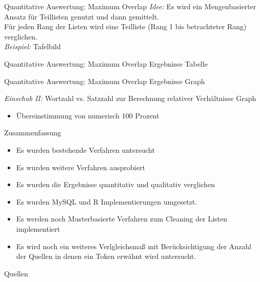 \documentclass{beamer}
\begin{document}
\begin{frame}{Quantitative Auswertung: Maximum Overlap}
	\emph{Idee: } Es wird ein Mengenbasierter Ansatz f\"ur Teillisten genutzt und dann gemittelt.\\
	F\"ur jeden Rang der Listen wird eine Teilliste (Rang 1 bis betrachteter Rang) verglichen.\\
	\vspace{1cm}
	\emph{Beispiel:} Tafelbild
\end{frame}

\begin{frame}{Quantitative Auswertung: Maximum Overlap Ergebnisse}
	Tabelle
\end{frame}

\begin{frame}{Quantitative Auswertung: Maximum Overlap Ergebnisse}
	Graph
\end{frame}

\begin{frame}{\emph{Einschub II: }Wortzahl vs. Satzzahl zur Berechnung relativer Verh\"altnisse}
	Graph
	\begin{itemize}
		\item{\"Ubereinstimmung von numerisch 100 Prozent}
	\end{itemize}
\end{frame}



\begin{frame}{Zusammenfassung}
	\begin{itemize}
		\item{Es wurden bestehende Verfahren untersucht}
		\item{Es wurden weitere Verfahren ausprobiert}
		\item{Es wurden die Ergebnisse quantitativ und qualitativ verglichen}
		\item{Es wurden MySQL und R Implementierungen umgesetzt.}
		\item{Es werden noch Musterbasierte Verfahren zum Cleaning der Listen implementiert}
		\item{Es wird noch ein weiteres Verlgleichsmaß mit Ber\"ucksichtigung der Anzahl der Quellen in denen ein Token erw\"ahnt wird untersucht.}
	\end{itemize}
\end{frame}



\begin{frame}[allowframebreaks]{Quellen}
	\nocite{*}
	
    
\end{frame}
\end{document}

